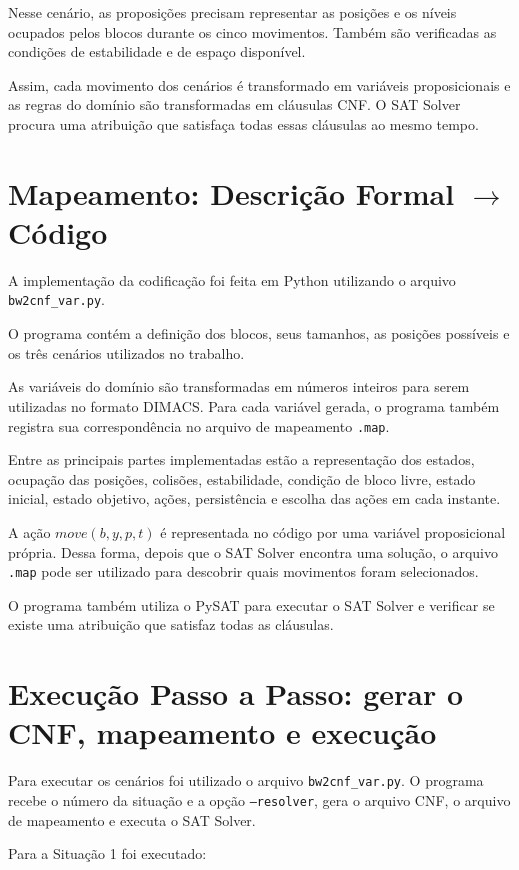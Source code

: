 \documentclass{article}
\begin{document}
Nesse cenário, as proposições precisam representar as posições e os níveis ocupados pelos blocos durante os cinco movimentos. Também são verificadas as condições de estabilidade e de espaço disponível.

Assim, cada movimento dos cenários é transformado em variáveis proposicionais e as regras do domínio são transformadas em cláusulas CNF. O SAT Solver procura uma atribuição que satisfaça todas essas cláusulas ao mesmo tempo.

\section{Mapeamento: Descrição Formal $\rightarrow$ Código}

A implementação da codificação foi feita em Python utilizando o arquivo \texttt{bw2cnf\_var.py}.

O programa contém a definição dos blocos, seus tamanhos, as posições possíveis e os três cenários utilizados no trabalho.

As variáveis do domínio são transformadas em números inteiros para serem utilizadas no formato DIMACS. Para cada variável gerada, o programa também registra sua correspondência no arquivo de mapeamento \texttt{.map}.

Entre as principais partes implementadas estão a representação dos estados, ocupação das posições, colisões, estabilidade, condição de bloco livre, estado inicial, estado objetivo, ações, persistência e escolha das ações em cada instante.

A ação $move(b,y,p,t)$ é representada no código por uma variável proposicional própria. Dessa forma, depois que o SAT Solver encontra uma solução, o arquivo \texttt{.map} pode ser utilizado para descobrir quais movimentos foram selecionados.

O programa também utiliza o PySAT para executar o SAT Solver e verificar se existe uma atribuição que satisfaz todas as cláusulas.

\section{Execução Passo a Passo: gerar o CNF, mapeamento e execução}

Para executar os cenários foi utilizado o arquivo \texttt{bw2cnf\_var.py}. O programa recebe o número da situação e a opção \texttt{--resolver}, gera o arquivo CNF, o arquivo de mapeamento e executa o SAT Solver.

Para a Situação 1 foi executado:
\end{document}
